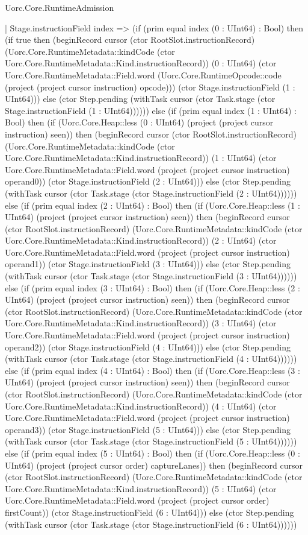 \begin{lexlean}{Uorc.Core.RuntimeAdmission}
\begin{semanticmodule}
{      | Stage.instructionField index => (if (prim equal index (0 : UInt64) : Bool) then (if true then (beginRecord cursor (ctor RootSlot.instructionRecord) (Uorc.Core.RuntimeMetadata::kindCode (ctor Uorc.Core.RuntimeMetadata::Kind.instructionRecord)) (0 : UInt64) (ctor Uorc.Core.RuntimeMetadata::Field.word (Uorc.Core.RuntimeOpcode::code (project (project cursor instruction) opcode))) (ctor Stage.instructionField (1 : UInt64))) else (ctor Step.pending (withTask cursor (ctor Task.stage (ctor Stage.instructionField (1 : UInt64)))))) else (if (prim equal index (1 : UInt64) : Bool) then (if (Uorc.Core.Heap::less (0 : UInt64) (project (project cursor instruction) seen)) then (beginRecord cursor (ctor RootSlot.instructionRecord) (Uorc.Core.RuntimeMetadata::kindCode (ctor Uorc.Core.RuntimeMetadata::Kind.instructionRecord)) (1 : UInt64) (ctor Uorc.Core.RuntimeMetadata::Field.word (project (project cursor instruction) operand0)) (ctor Stage.instructionField (2 : UInt64))) else (ctor Step.pending (withTask cursor (ctor Task.stage (ctor Stage.instructionField (2 : UInt64)))))) else (if (prim equal index (2 : UInt64) : Bool) then (if (Uorc.Core.Heap::less (1 : UInt64) (project (project cursor instruction) seen)) then (beginRecord cursor (ctor RootSlot.instructionRecord) (Uorc.Core.RuntimeMetadata::kindCode (ctor Uorc.Core.RuntimeMetadata::Kind.instructionRecord)) (2 : UInt64) (ctor Uorc.Core.RuntimeMetadata::Field.word (project (project cursor instruction) operand1)) (ctor Stage.instructionField (3 : UInt64))) else (ctor Step.pending (withTask cursor (ctor Task.stage (ctor Stage.instructionField (3 : UInt64)))))) else (if (prim equal index (3 : UInt64) : Bool) then (if (Uorc.Core.Heap::less (2 : UInt64) (project (project cursor instruction) seen)) then (beginRecord cursor (ctor RootSlot.instructionRecord) (Uorc.Core.RuntimeMetadata::kindCode (ctor Uorc.Core.RuntimeMetadata::Kind.instructionRecord)) (3 : UInt64) (ctor Uorc.Core.RuntimeMetadata::Field.word (project (project cursor instruction) operand2)) (ctor Stage.instructionField (4 : UInt64))) else (ctor Step.pending (withTask cursor (ctor Task.stage (ctor Stage.instructionField (4 : UInt64)))))) else (if (prim equal index (4 : UInt64) : Bool) then (if (Uorc.Core.Heap::less (3 : UInt64) (project (project cursor instruction) seen)) then (beginRecord cursor (ctor RootSlot.instructionRecord) (Uorc.Core.RuntimeMetadata::kindCode (ctor Uorc.Core.RuntimeMetadata::Kind.instructionRecord)) (4 : UInt64) (ctor Uorc.Core.RuntimeMetadata::Field.word (project (project cursor instruction) operand3)) (ctor Stage.instructionField (5 : UInt64))) else (ctor Step.pending (withTask cursor (ctor Task.stage (ctor Stage.instructionField (5 : UInt64)))))) else (if (prim equal index (5 : UInt64) : Bool) then (if (Uorc.Core.Heap::less (0 : UInt64) (project (project cursor order) captureLanes)) then (beginRecord cursor (ctor RootSlot.instructionRecord) (Uorc.Core.RuntimeMetadata::kindCode (ctor Uorc.Core.RuntimeMetadata::Kind.instructionRecord)) (5 : UInt64) (ctor Uorc.Core.RuntimeMetadata::Field.word (project (project cursor order) firstCount)) (ctor Stage.instructionField (6 : UInt64))) else (ctor Step.pending (withTask cursor (ctor Task.stage (ctor Stage.instructionField (6 : UInt64)))))) }
\end{semanticmodule}
\end{lexlean}
